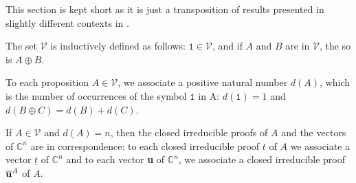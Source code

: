 \documentclass[screen, sigconf,authorversion,nonacm]{acmart}
\theoremstyle{acmdefinition}
\numberwithin{equation}{section}
\newcommand\one{\ensuremath{\mathtt 1}}
\begin{document}
This section is kept short as it is just a transposition of results
presented in slightly different contexts in
\cite{DiazcaroDowekTCS23,DiazcaroDowekMSCS24}.

\begin{definition}
The set $\mathcal{V}$ is inductively defined as follows: $\one \in
\mathcal{V}$, and if $A$ and $B$ are in $\mathcal{V}$, the so is $A
\oplus B$.
\end{definition}

\begin{definition}
To each proposition $A \in \mathcal{V}$, we associate a positive
natural number $d(A)$, which is the number of occurrences of the
symbol $\one$ in A: $d(\one) = 1$ and $d(B \oplus C) = d(B) + d(C)$.
\end{definition}

If $A \in \mathcal{V}$ and $d(A) = n$, then the closed irreducible
proofs of $A$ and the vectors of ${\mathbb C}^n$ are in
correspondence: to each closed irreducible proof $t$ of $A$ we
associate a vector $\underline{t}$ of ${\mathbb C}^n$ and to each
vector {\bf u} of ${\mathbb C}^n$, we associate a closed irreducible
proof $\overline{\bf u}^A$ of $A$.
\end{document}
